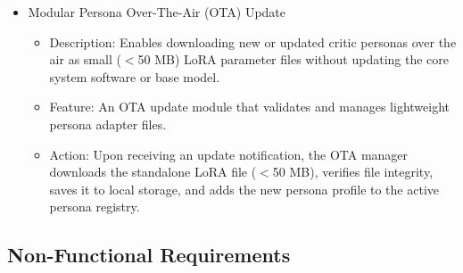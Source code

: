 \documentclass[conference]{IEEEtran}
\begin{document}
\begin{itemize}
    \item Modular Persona Over-The-Air (OTA) Update
    \begin{itemize}
        \item Description: Enables downloading new or updated critic personas over the air as small ($<$50 MB) LoRA parameter files without updating the core system software or base model.
        \item Feature: An OTA update module that validates and manages lightweight persona adapter files.
        \item Action: Upon receiving an update notification, the OTA manager downloads the standalone LoRA file ($<$50 MB), verifies file integrity, saves it to local storage, and adds the new persona profile to the active persona registry.
    \end{itemize}
\end{itemize}

\subsection{Non-Functional Requirements}
\end{document}
